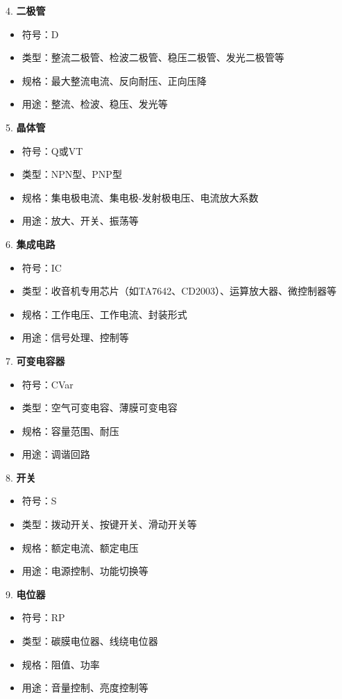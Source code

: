 \documentclass[12pt,UTF8]{ctexbook}
\begin{document}
4. \textbf{二极管}
   \begin{itemize}[leftmargin=3.5em]
   \item 符号：D
   \item 类型：整流二极管、检波二极管、稳压二极管、发光二极管等
   \item 规格：最大整流电流、反向耐压、正向压降
   \item 用途：整流、检波、稳压、发光等
   \end{itemize}

5. \textbf{晶体管}
   \begin{itemize}[leftmargin=3.5em]
   \item 符号：Q或VT
   \item 类型：NPN型、PNP型
   \item 规格：集电极电流、集电极-发射极电压、电流放大系数
   \item 用途：放大、开关、振荡等
   \end{itemize}

6. \textbf{集成电路}
   \begin{itemize}[leftmargin=3.5em]
   \item 符号：IC
   \item 类型：收音机专用芯片（如TA7642、CD2003）、运算放大器、微控制器等
   \item 规格：工作电压、工作电流、封装形式
   \item 用途：信号处理、控制等
   \end{itemize}

7. \textbf{可变电容器}
   \begin{itemize}[leftmargin=3.5em]
   \item 符号：CVar
   \item 类型：空气可变电容、薄膜可变电容
   \item 规格：容量范围、耐压
   \item 用途：调谐回路
   \end{itemize}

8. \textbf{开关}
   \begin{itemize}[leftmargin=3.5em]
   \item 符号：S
   \item 类型：拨动开关、按键开关、滑动开关等
   \item 规格：额定电流、额定电压
   \item 用途：电源控制、功能切换等
   \end{itemize}

9. \textbf{电位器}
   \begin{itemize}[leftmargin=3.5em]
   \item 符号：RP
   \item 类型：碳膜电位器、线绕电位器
   \item 规格：阻值、功率
   \item 用途：音量控制、亮度控制等
   \end{itemize}
\end{document}
